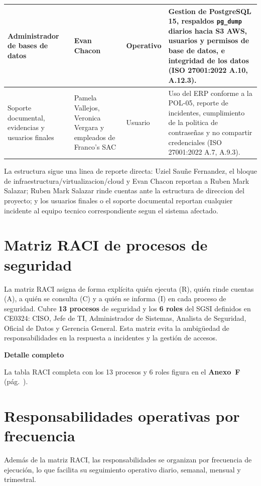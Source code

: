 \documentclass[11pt, a4paper, oneside]{report}
\newenvironment{notabox}[1]{%
  \begin{lrbox}{\notaboxsb}%
  \begin{minipage}{\dimexpr\textwidth-2\fboxsep\relax}%
  \vspace{4pt}\textcolor{upeu_dark}{\textbf{#1}}\\[2pt]\small%
}{%
  \vspace{4pt}%
  \end{minipage}%
  \end{lrbox}%
  \vspace{6pt}\par\noindent\colorbox{upeu_light}{\usebox{\notaboxsb}}\par\vspace{6pt}%
}
\begin{document}
\begin{xltabular}{\textwidth}{@{}|L{3.4cm}|L{2.6cm}|L{1.6cm}|X|@{}}
{\small Administrador de bases de datos} & {\small Evan Chacon} & {\small Operativo} & {\small Gestion de PostgreSQL 15, respaldos \texttt{pg\_dump} diarios hacia S3 AWS, usuarios y permisos de base de datos, e integridad de los datos (ISO 27001:2022 A.10, A.12.3).} \\ \hline

{\small Soporte documental, evidencias y usuarios finales} & {\small Pamela Vallejos, Veronica Vergara y empleados de Franco's SAC} & {\small Usuario} & {\small Uso del ERP conforme a la POL-05, reporte de incidentes, cumplimiento de la politica de contraseñas y no compartir credenciales (ISO 27001:2022 A.7, A.9.3).} \\ \hline

\end{xltabular}

\normalsize

La estructura sigue una linea de reporte directa: Uziel Sauñe Fernandez, el bloque de infraestructura/virtualizacion/cloud y Evan Chacon reportan a Ruben Mark Salazar; Ruben Mark Salazar rinde cuentas ante la estructura de direccion del proyecto; y los usuarios finales o el soporte documental reportan cualquier incidente al equipo tecnico correspondiente segun el sistema afectado.

\section{Matriz RACI de procesos de seguridad}

La matriz RACI asigna de forma explícita quién ejecuta (R), quién rinde cuentas (A), a quién se consulta (C) y a quién se informa (I) en cada proceso de seguridad. Cubre \textbf{13 procesos} de seguridad y los \textbf{6 roles} del SGSI definidos en CE0324: CISO, Jefe de TI, Administrador de Sistemas, Analista de Seguridad, Oficial de Datos y Gerencia General. Esta matriz evita la ambigüedad de responsabilidades en la respuesta a incidentes y la gestión de accesos.

\begin{notabox}{Detalle completo}
La tabla RACI completa con los 13 procesos y 6 roles figura en el \textbf{Anexo~F} (pág.~\pageref{anex:raci}).
\end{notabox}
\section{Responsabilidades operativas por frecuencia}

Además de la matriz RACI, las responsabilidades se organizan por frecuencia de ejecución, lo que facilita su seguimiento operativo diario, semanal, mensual y trimestral.
\end{document}
